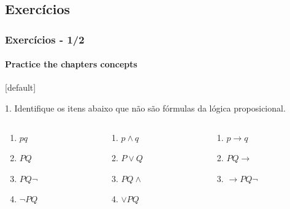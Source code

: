 \documentclass[10pt, headsepline, captions=tableabove,xcolor=table]{beamer}
\begin{document}
\subsection{Exercícios}
%
\begin{frame}[t] %
    \frametitle{Exercícios - 1/2}
    \framesubtitle{Practice the chapters concepts}
    \small
    [default]
    \begin{exampleblock}{1. Identifique os itens abaixo que não são fórmulas da lógica proposicional.}
        \begin{columns}[T]
            \begin{column}{0.15\textwidth}
                \begin{enumerate}[\bf a.]
                    \item $pq$
                    \item $PQ$
                    \item $PQ \lnot$
                    \item $\lnot PQ$
                \end{enumerate}
            \end{column}
            \hspace*{-5mm}
            \begin{column}{0.15\textwidth}
                \begin{enumerate}[\bf a.]
                    \addtocounter{enumi}{4}
                    \item $p \land q$
                    \item $P \lor Q$
                    \item $PQ \land$
                    \item $\lor PQ$
                \end{enumerate}
            \end{column}
            \hspace*{-5mm}
            \begin{column}{0.20\textwidth}
                \begin{enumerate}[\bf a.]
                    \addtocounter{enumi}{8}
                    \item $p \rightarrow q$
                    \item $PQ \rightarrow$
                    \item $\rightarrow PQ \lnot$

\end{enumerate}
\end{column}
\end{columns}
\end{exampleblock}
\end{frame}
\end{document}
